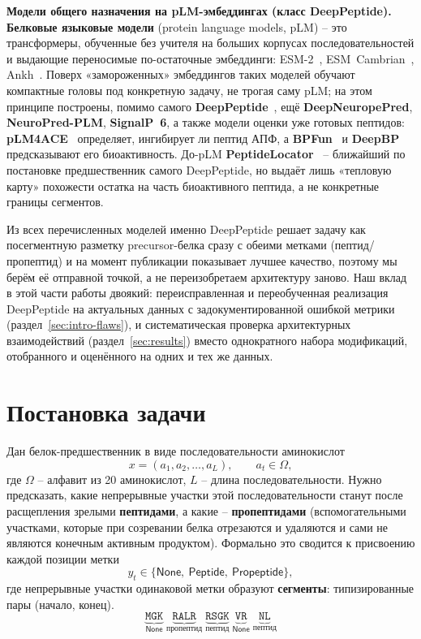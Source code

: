 \documentclass{article}
\begin{document}
\textbf{Модели общего назначения на pLM-эмбеддингах (класс DeepPeptide).} \textbf{Белковые языковые модели} (protein language models, pLM) -- это трансформеры, обученные без учителя на больших корпусах последовательностей и выдающие переносимые по-остаточные эмбеддинги: ESM-2~\cite{esm2_2019}, ESM~Cambrian~\cite{esm_cambrian_blog_2024}, Ankh~\cite{ankh2023}. Поверх «замороженных» эмбеддингов таких моделей обучают компактные головы под конкретную задачу, не трогая саму pLM; на этом принципе построены, помимо самого \textbf{DeepPeptide}~\cite{deeppeptide2023}, ещё \textbf{DeepNeuropePred}, \textbf{NeuroPred-PLM}, \textbf{SignalP~6}, а также модели оценки уже готовых пептидов: \textbf{pLM4ACE}~\cite{du2024plm4ace} определяет, ингибирует ли пептид АПФ, а \textbf{BPFun}~\cite{bpfun2025} и \textbf{DeepBP}~\cite{zhang2024deepbp} предсказывают его биоактивность. До-pLM \textbf{PeptideLocator}~\cite{mooney2013peptidelocator} -- ближайший по постановке предшественник самого DeepPeptide, но выдаёт лишь «тепловую карту» похожести остатка на часть биоактивного пептида, а не конкретные границы сегментов.

Из всех перечисленных моделей именно DeepPeptide решает задачу как посегментную разметку precursor-белка сразу с обеими метками (пептид/пропептид) и на момент публикации показывает лучшее качество, поэтому мы берём её отправной точкой, а не переизобретаем архитектуру заново. Наш вклад в этой части работы двоякий: переисправленная и переобученная реализация DeepPeptide на актуальных данных с задокументированной ошибкой метрики (раздел~\ref{sec:intro-flaws}), и систематическая проверка архитектурных взаимодействий (раздел~\ref{sec:results}) вместо однократного набора модификаций, отобранного и оценённого на одних и тех же данных.

\section{Постановка задачи}
\label{sec:problem}

Дан белок-предшественник в виде последовательности аминокислот
$$ x = (a_1, a_2, \dots, a_L), \qquad a_t \in \Omega, $$
где $\Omega$ -- алфавит из 20 аминокислот, $L$ -- длина последовательности. Нужно предсказать, какие непрерывные участки этой последовательности станут после расщепления зрелыми \textbf{пептидами}, а какие -- \textbf{пропептидами} (вспомогательными участками, которые при созревании белка отрезаются и удаляются и сами не являются конечным активным продуктом). Формально это сводится к присвоению каждой позиции метки
$$ y_t \in \{\textsf{None},\ \textsf{Peptide},\ \textsf{Propeptide}\}, $$
где непрерывные участки одинаковой метки образуют \textbf{сегменты}: типизированные пары (начало, конец).
$$
\underbrace{\texttt{MGK}}_{\textsf{None}}\;
\underbrace{\texttt{RALR}}_{\textsf{пропептид}}\;
\underbrace{\texttt{RSGK}}_{\textsf{пептид}}\;
\underbrace{\texttt{VR}}_{\textsf{None}}\;
\underbrace{\texttt{NL}}_{\textsf{пептид}}
$$
\end{document}
